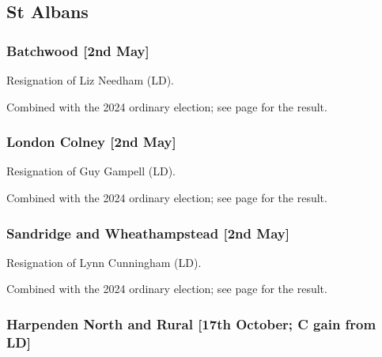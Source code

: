 \documentclass[a4paper,openany]{book}
\begin{document}
\begin{resultsiii}
\subsection*{St Albans}

\subsubsection*{Batchwood \hspace*{\fill}\nolinebreak[1]%
	\enspace\hspace*{\fill}
	[2nd May]}


Resignation of Liz Needham (LD).

Combined with the 2024 ordinary election; see page \pageref{StAlbansBatchwood} for the result.

\subsubsection*{London Colney \hspace*{\fill}\nolinebreak[1]%
	\enspace\hspace*{\fill}
	[2nd May]}


Resignation of Guy Gampell (LD).

Combined with the 2024 ordinary election; see page \pageref{StAlbansLondonColney} for the result.

\subsubsection*{Sandridge and Wheathampstead \hspace*{\fill}\nolinebreak[1]%
	\enspace\hspace*{\fill}
	[2nd May]}


Resignation of Lynn Cunningham (LD).

Combined with the 2024 ordinary election; see page \pageref{StAlbansSandridgeWheathampstead} for the result.

\subsubsection*{Harpenden North and Rural \hspace*{\fill}\nolinebreak[1]%
	\enspace\hspace*{\fill}
	[17th October; C gain from LD]}


\end{resultsiii}
\end{document}
